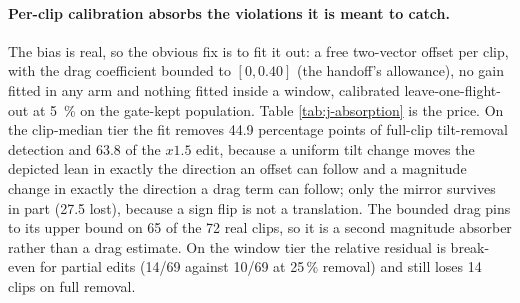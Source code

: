 \paragraph{Per-clip calibration absorbs the violations it is meant to catch.} The bias is real, so
the obvious fix is to fit it out: a free two-vector offset per clip, with the drag coefficient
bounded to $[0,0.40]$ (the handoff's allowance), no gain fitted in any arm and nothing fitted inside
a window, calibrated leave-one-flight-out at \SI{5}{\percent} on the gate-kept population. Table
\ref{tab:j-absorption} is the price. On the clip-median tier the fit removes
\SI{44.9}{} percentage points of full-clip tilt-removal detection and \SI{63.8}{} of the $x1.5$
edit, because a uniform tilt change moves the depicted lean in exactly the direction an offset can
follow and a magnitude change in exactly the direction a drag term can follow; only the mirror
survives in part (\SI{27.5}{} lost), because a sign flip is not a translation. The bounded drag
pins to its upper bound on 65 of the 72 real clips, so it is a second magnitude absorber rather
than a drag estimate. On the window tier the relative residual is break-even for partial edits
(\num{14}/69 against \num{10}/69 at 25\,\% removal) and still loses \num{14} clips on full removal.

